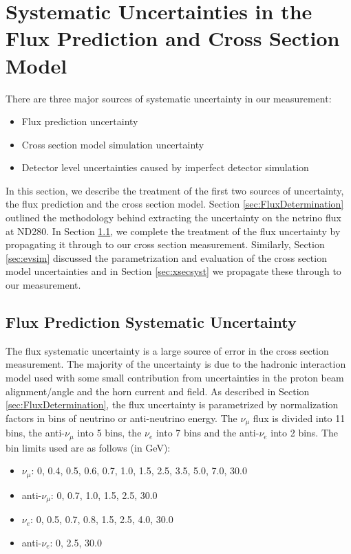 \section{Systematic Uncertainties in the Flux Prediction and Cross Section Model}
\label{sec:fluxxsecsyst}

There are three major sources of systematic uncertainty in our measurement:

\begin{itemize}
\item Flux prediction uncertainty
\item Cross section model simulation uncertainty
\item Detector level uncertainties caused by imperfect detector simulation
\end{itemize}

In this section, we describe the treatment of the first two sources of uncertainty, the flux prediction and the cross section model. Section \ref{sec:FluxDetermination} outlined the methodology behind extracting the uncertainty on the netrino flux at ND280. In Section \ref{sec:fluxsyst}, we complete the treatment of the flux uncertainty by propagating it through to our cross section measurement. Similarly, Section \ref{sec:evsim} discussed the parametrization and evaluation of the cross section model uncertainties and in Section \ref{sec:xsecsyst} we propagate these through to our measurement.

\subsection{Flux Prediction Systematic Uncertainty}
\label{sec:fluxsyst}

The flux systematic uncertainty is a large source of error in the cross section measurement. The majority of the uncertainty is due to the hadronic interaction model used with some small contribution from uncertainties in the proton beam alignment/angle and the horn current and field. As described in Section \ref{sec:FluxDetermination}, the flux uncertainty is parametrized by normalization factors in bins of neutrino or anti-neutrino energy. The $\nu_\mu$ flux is divided into 11 bins, the anti-$\nu_\mu$ into 5 bins, the $\nu_e$ into 7 bins and the anti-$\nu_e$ into 2 bins. The bin limits used are as follows (in GeV):

\begin{itemize}
\item $\nu_\mu$: 0, 0.4, 0.5, 0.6, 0.7, 1.0, 1.5, 2.5, 3.5, 5.0, 7.0, 30.0
\item anti-$\nu_\mu$: 0, 0.7, 1.0, 1.5, 2.5, 30.0
\item $\nu_e$: 0, 0.5, 0.7, 0.8, 1.5, 2.5, 4.0, 30.0
\item anti-$\nu_e$: 0, 2.5, 30.0
\end{itemize}


